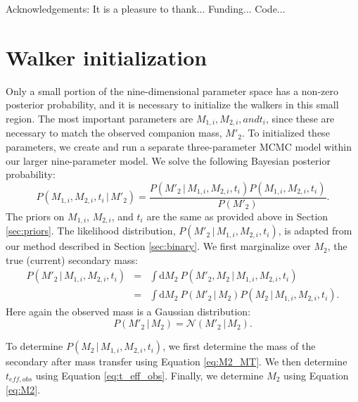 \documentclass[12pt, preprint]{aastex}
\newcommand{\given}{\,|\,}
\newcommand{\dd}{\mathrm{d}}
\begin{document}
\acknowledgements
Acknowledgements:
It is a pleasure to thank...
Funding...
Code...



\appendix

\section{Walker initialization}

Only a small portion of the nine-dimensional parameter space has a non-zero posterior probability, and it is necessary to initialize the walkers in this small region. The most important parameters are $M_{1,i}, M_{2,i}, and t_i$, since these are necessary to match the observed companion mass, $M'_2$. To initialized these parameters, we create and run a separate three-parameter MCMC model within our larger nine-parameter model. We solve the following Bayesian posterior probability:
\begin{equation}
P(M_{1,i}, M_{2,i}, t_i \given M'_2) = \frac{ P(M'_2 \given M_{1,i}, M_{2,i}, t_i ) P( M_{1,i}, M_{2,i}, t_i )}{P(M'_2)}.
\end{equation}
The priors on $M_{1,i}$, $M_{2,i}$, and $t_i$ are the same as provided above in Section \ref{sec:priors}. The likelihood distribution, $P(M'_2 \given M_{1,i}, M_{2,i}, t_i )$, is adapted from our method described in Section \ref{sec:binary}. We first marginalize over $M_2$, the true (current) secondary mass:
\begin{eqnarray}
P(M'_2 \given M_{1,i}, M_{2,i}, t_i ) &=& \int \dd M_2\ P(M'_2, M_2 \given M_{1,i}, M_{2,i}, t_i ) \nonumber \\
&=& \int \dd M_2\ P(M'_2 \given M_2) P(M_2 \given M_{1,i}, M_{2,i}, t_i).
\end{eqnarray}
Here again the observed mass is a Gaussian distribution: 
\begin{equation}
P(M'_2 \given M_2) = \mathcal{N}(M'_2 \given M_2).
\end{equation}

To determine $P(M_2 \given M_{1,i}, M_{2,i}, t_i )$, we first determine the mass of the secondary after mass transfer using Equation \ref{eq:M2_MT}. We then determine $t_{eff,obs}$ using Equation \ref{eq:t_eff_obs}. Finally, we determine $M_2$ using Equation \ref{eq:M2}.
\end{document}
